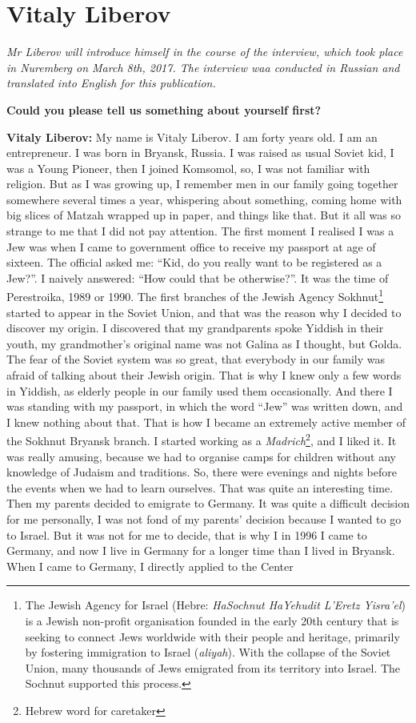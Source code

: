\section{Vitaly Liberov}

\textit{Mr Liberov will introduce himself in the course of the interview, which took place in Nuremberg on March 8th, 2017. The interview waa conducted in Russian and translated into English for this publication.}\par
\vspace*{2em}
\textbf{Could you please tell us something about yourself first?} 

\textbf{Vitaly Liberov:} My name is Vitaly Liberov. I am forty years old. I am an entrepreneur. I was born in Bryansk, Russia. I was raised as usual Soviet kid, I was a Young Pioneer, then I joined Komsomol, so, I was not familiar with religion. But as I was growing up, I remember men in our family going together somewhere several times a year, whispering about something, coming home with big slices of Matzah wrapped up in paper, and things like that. But it all was so strange to me that I did not pay attention. The first moment I realised I was a Jew was when I came to government office to receive my passport at age of sixteen. The official asked me: “Kid, do you really want to be registered as a Jew?”. I naively answered: “How could that be otherwise?”. It was the time of Perestroika, 1989 or 1990. The first branches of the Jewish Agency Sokhnut\footnote{The Jewish Agency for Israel (Hebre: \textit{HaSochnut HaYehudit L'Eretz Yisra'el}) is a Jewish non-profit organisation founded in the early 20th century that is seeking to connect Jews worldwide with their people and heritage, primarily by fostering immigration to Israel (\textit{aliyah}). With the collapse of the Soviet Union, many thousands of Jews emigrated from its territory into Israel. The Sochnut supported this process.} started to appear in the Soviet Union, and that was the reason why I decided to discover my origin. I discovered that my grandparents spoke Yiddish in their youth, my grandmother’s original name was not Galina as I thought, but Golda. The fear of the Soviet system was so great, that everybody in our family was afraid of talking about their Jewish origin. That is why I knew only a few words in Yiddish, as elderly people in our family used them occasionally. And there I was standing with my passport, in which the word “Jew” was written down, and I knew nothing about that. That is how I became an extremely active member of the Sokhnut Bryansk branch. I started working as a \textit{Madrich}\footnote{Hebrew word for caretaker}, and I liked it.  It was really amusing, because we had to organise camps for children without any knowledge of Judaism and traditions. So, there were evenings and nights before the events when we had to learn ourselves. That was quite an interesting time. Then my parents decided to emigrate to Germany. It was quite a difficult decision for me personally, I was not fond of my parents’ decision because I wanted to go to Israel. But it was not for me to decide, that is why I in 1996 I came to Germany, and now I live in Germany for a longer time than I lived in Bryansk. When I came to Germany, I directly applied to the Center 